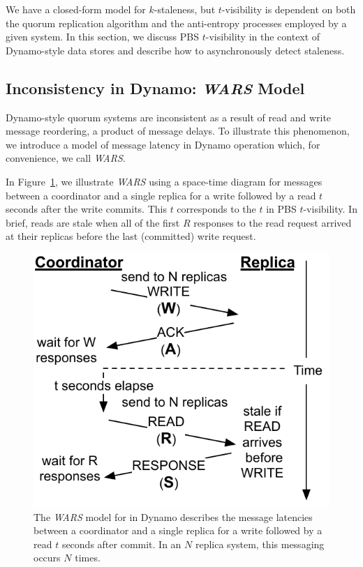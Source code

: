\documentclass{vldb}
\newcommand{\subsectionskip}{-0em}
\begin{document}
We have a closed-form model for $k$-staleness, but
$t$-visibility is dependent on both the quorum replication algorithm
and the anti-entropy processes employed by a given system.  In this
section, we discuss PBS $t$-visibility in the context of Dynamo-style
data stores and describe how to asynchronously detect
staleness.

\vspace{\subsectionskip}\subsection{Inconsistency in Dynamo: {\large \textit{WARS}} Model}
\label{sec:wars}

Dynamo-style quorum systems are inconsistent as a result of read and
write message reordering, a product of message delays.  To illustrate
this phenomenon, we introduce a model of message latency in Dynamo
operation which, for convenience, we call \textit{WARS}.

In Figure~\ref{fig:dynamo-diagram}, we illustrate \textit{WARS} using
a space-time diagram for messages between a coordinator and a single
replica for a write followed by a read $t$ seconds after the write
commits.  This $t$ corresponds to the $t$ in PBS $t$-visibility. In
brief, reads are stale when all of the first $R$ responses to the read
request arrived at their replicas before the last
(committed) write request.

\begin{figure}
\centering
\includegraphics[width=.8\columnwidth]{figs/dynamostale.pdf}
\vspace{-8pt}
\caption{The \textit{WARS} model for in Dynamo describes the message
  latencies between a coordinator and a single replica for a write
  followed by a read $t$ seconds after commit.  In an $N$ replica
  system, this messaging occurs $N$ times.}
\vspace{-12pt}
\label{fig:dynamo-diagram}
\end{figure}
\end{document}
